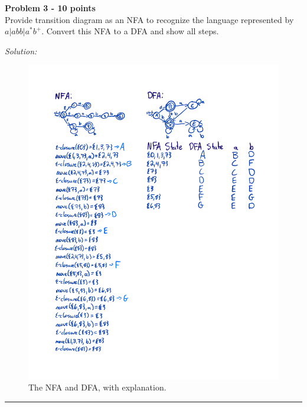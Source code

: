 \documentclass[a4paper, 11pt]{article}
\newenvironment{problem}[2][Problem]
    { \begin{mdframed}[backgroundcolor=gray!20] \textbf{#1 #2} \\}
    {  \end{mdframed}}
\newenvironment{solution}
    {\textit{Solution:}}
    {}
\begin{document}
\begin{problem}{3 - 10 points}
Provide transition diagram as an NFA to recognize the language represented by $a|abb|a^*b^+$. Convert this NFA to a DFA and show all steps.

\end{problem}

\begin{solution}
    \begin{figure}[H]
        \centering
        \includegraphics[scale=0.8]{Pset2.pdf}
        \caption{The NFA and DFA, with explanation.}
        \label{fig_2c}
    \end{figure}
\end{solution}

\noindent\rule{7in}{2.8pt}
\end{document}
